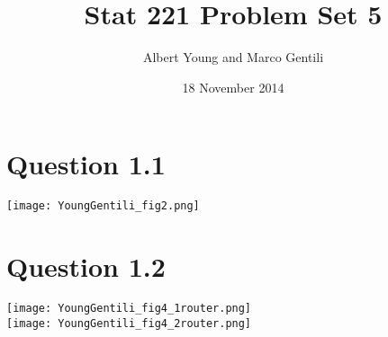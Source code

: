\documentclass[10pt]{article}
\title{Stat 221 Problem Set 5}
\author{Albert Young and Marco Gentili}
\date{18 November 2014}
\begin{document}
\maketitle

\section*{Question 1.1}
\texttt{[image: YoungGentili\_fig2.png]}\\
\section*{Question 1.2}
\texttt{[image: YoungGentili\_fig4\_1router.png]}\\
\texttt{[image: YoungGentili\_fig4\_2router.png]}\\
\end{document}
